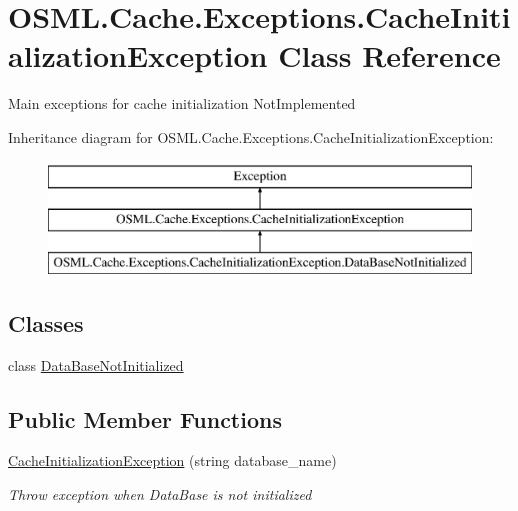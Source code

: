 \hypertarget{classOSML_1_1Cache_1_1Exceptions_1_1CacheInitializationException}{}\section{O\+S\+M\+L.\+Cache.\+Exceptions.\+Cache\+Initialization\+Exception Class Reference}
\label{classOSML_1_1Cache_1_1Exceptions_1_1CacheInitializationException}


Main exceptions for cache initialization Not\+Implemented  


Inheritance diagram for O\+S\+M\+L.\+Cache.\+Exceptions.\+Cache\+Initialization\+Exception\+:\begin{figure}[H]
\begin{center}
\leavevmode
\includegraphics[height=3.000000cm]{classOSML_1_1Cache_1_1Exceptions_1_1CacheInitializationException}
\end{center}
\end{figure}
\subsection*{Classes}
\begin{DoxyCompactItemize}
\item 
class \mbox{\hyperlink{classOSML_1_1Cache_1_1Exceptions_1_1CacheInitializationException_1_1DataBaseNotInitialized}{Data\+Base\+Not\+Initialized}}
\end{DoxyCompactItemize}
\subsection*{Public Member Functions}
\begin{DoxyCompactItemize}
\item 
\mbox{\hyperlink{classOSML_1_1Cache_1_1Exceptions_1_1CacheInitializationException_af144c4438d83d41d3bc5498cad749719}{Cache\+Initialization\+Exception}} (string database\+\_\+name)
\begin{DoxyCompactList}\small\item\em Throw exception when Data\+Base is not initialized \end{DoxyCompactList}\end{DoxyCompactItemize}


